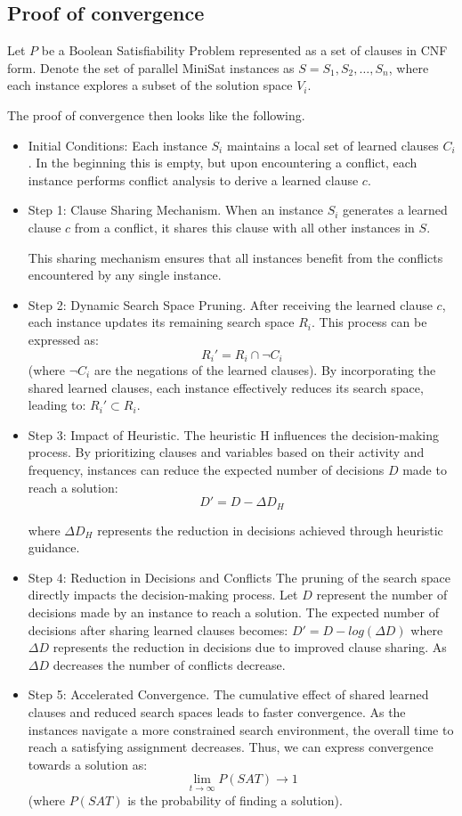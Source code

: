 \documentclass{article}
\begin{document}
\subsection{Proof of convergence}

Let $P$ be a Boolean Satisfiability Problem represented as a set of clauses in CNF form. Denote the set of parallel MiniSat instances as $S={S_1,S_2,…,S_n}$, where each instance explores a subset of the solution space $V_i$.

The proof of convergence then looks like the following.
\begin{itemize}
    \item Initial Conditions: Each instance $S_i$ maintains a local set of learned clauses $C_i$. In the beginning this is empty, but upon encountering a conflict, each instance performs conflict analysis to derive a learned clause $c$.
    \item Step 1: Clause Sharing Mechanism. When an instance $S_i$ generates a learned clause $c$ from a conflict, it shares this clause with all other instances in $S$. %

    This sharing mechanism ensures that all instances benefit from the conflicts encountered by any single instance.
    \item Step 2: Dynamic Search Space Pruning. After receiving the learned clause $c$, each instance updates its remaining search space $R_i$. This process can be expressed as: $$R_i' = R_i \cap \neg C_i$$ (where $\neg C_i$ are the negations of the learned clauses). By incorporating the shared learned clauses, each instance effectively reduces its search space, leading to: $R_i' \subset R_i$.
    \item  Step 3: Impact of Heuristic. The heuristic H influences the decision-making process. By prioritizing clauses and variables based on their activity and frequency, instances can reduce the expected number of decisions $D$ made to reach a solution:
    $$D' = D - \Delta D_H$$

    where $\Delta D_H$ represents the reduction in decisions achieved through heuristic guidance.
    \item Step 4: Reduction in Decisions and Conflicts
    The pruning of the search space directly impacts the decision-making process. Let $D$ represent the number of decisions made by an instance to reach a solution. The expected number of decisions after sharing learned clauses becomes: $D'=D - log(\Delta D)$
    where $\Delta D$ represents the reduction in decisions due to improved clause sharing. As $\Delta D$ decreases the number of conflicts decrease.

    \item Step 5: Accelerated Convergence. The cumulative effect of shared learned clauses and reduced search spaces leads to faster convergence. As the instances navigate a more constrained search environment, the overall time to reach a satisfying assignment decreases. Thus, we can express convergence towards a solution as: $$ \lim_{t \rightarrow \infty}P(SAT) \rightarrow 1 $$ (where $P(SAT)$ is the probability of finding a solution).
\end{itemize}
\end{document}
